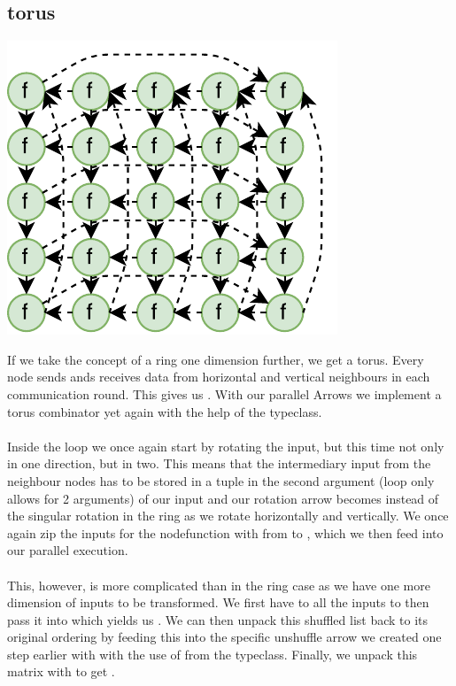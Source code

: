\subsection{torus}
\begin{center}
	\includegraphics[scale=0.75]{images/torus}
\end{center}
If we take the concept of a ring one dimension further, we get a torus. Every node sends ands receives data from horizontal and vertical neighbours in each communication round. This gives us . With our parallel Arrows we implement a torus combinator yet again with the help of the  typeclass.
\\\\
Inside the loop we once again start by rotating the input, but this time not only in one direction, but in two. This means that the intermediary input from the neighbour nodes has to be stored in a tuple \code{([[fut a]], [[fut b]])} in the second argument (loop only allows for 2 arguments) of our input \code{([[c]], ([[fut a]], [[fut b]]))} and our rotation arrow becomes  instead of the singular rotation in the ring as we rotate \code{[[fut a]]} horizontally and \code{[[fut b]]} vertically. We once again zip the inputs for the nodefunction with  from \code{([[c]], ([[fut a]], [[fut b]]))} to , which we then feed into our parallel execution.
\\\\
This, however, is more complicated than in the ring case as we have one more dimension of inputs to be transformed. We first have to  all the inputs to then pass it into  which yields us . We can then unpack this shuffled list back to its original ordering by feeding this into the specific unshuffle arrow we created one step earlier with  with the use of  from the  typeclass. Finally, we unpack this matrix \code{[[[(d, fut a, fut b)]]} with  to get  \code{([[d]], ([[fut a]], [[fut b]]))}.
